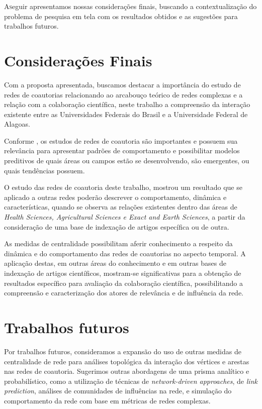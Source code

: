 
\lettrine{A} seguir apresentamos nossas considerações finais, buscando a contextualização do problema de pesquisa em tela com os resultados obtidos e as sugestões para trabalhos futuros.

\section{\textbf{Considerações Finais}} 

Com a proposta apresentada, buscamos destacar a importância do estudo de redes de coautorias relacionando ao arcabouço teórico de redes complexas e a relação com a colaboração científica, neste trabalho a compreensão da interação existente entre as Universidades Federais do Brasil e a Universidade Federal de Alagoas.

Conforme \citep{Barabasi2001}, os estudos de redes de coautoria são importantes e possuem sua relevância para apresentar padrões de comportamento e possibilitar modelos preditivos de quais áreas ou campos estão se desenvolvendo, são emergentes, ou quais tendências possuem.

O estudo das redes de coautoria deste trabalho, mostrou um resultado que se aplicado a outras redes poderão descrever o comportamento, dinâmica e características, quando se observa as relações existentes dentro das áreas de \textit{Health Sciences, Agricultural Sciences e Exact and Earth Sciences}, a partir da consideração de uma base de indexação de artigos específica ou de outra.

As medidas de centralidade possibilitam aferir conhecimento a respeito da dinâmica e do comportamento das redes de coautorias no aspecto temporal. A aplicação destas, em outras áreas do conhecimento e em outras bases de indexação de artigos científicos, mostram-se significativas para a obtenção de resultados específico para avaliação da colaboração científica, possibilitando a compreensão e caracterização dos atores de relevância e de influência da rede.


\section{\textbf{Trabalhos futuros}}

Por trabalhos futuros, consideramos a expansão do uso de outras medidas de centralidade de rede para análises topológica da interação dos vértices e arestas nas redes de coautoria. Sugerimos outras abordagens de uma prisma analítico e probabilístico, como a utilização de técnicas de \textit{network-driven approaches}, de \textit{link prediction}, análises de comunidades de influências na rede, e simulação do comportamento da rede com base em métricas de redes complexas.



 